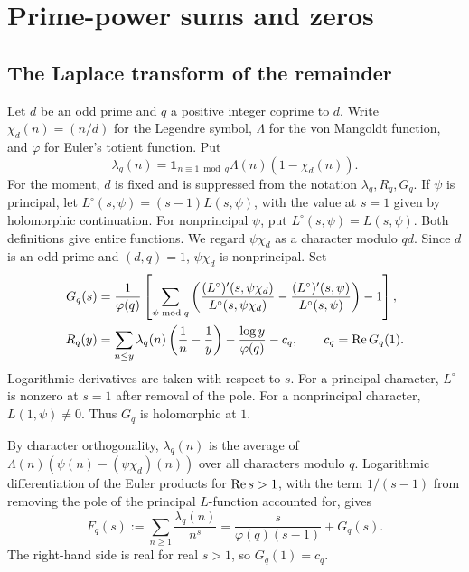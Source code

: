 \section{Prime-power sums and zeros}\label{sec:analytic}

\subsection{The Laplace transform of the remainder}

Let \(d\) be an odd prime and \(q\) a positive integer coprime to \(d\).
Write \(\chi_d(n)=(n/d)\) for the Legendre symbol, \(\Lambda\) for the von Mangoldt function,
and \(\varphi\) for Euler's totient function. Put
\[
  \lambda_q(n)=\mathbf 1_{n\equiv1\bmod q}\Lambda(n)(1-\chi_d(n)).
\]
For the moment, \(d\) is fixed and is suppressed from the notation \(\lambda_q,R_q,G_q\).
If \(\psi\) is principal, let \(L^\circ(s,\psi)=(s-1)L(s,\psi)\), with the value at
\(s=1\) given by holomorphic continuation. For nonprincipal \(\psi\), put
\(L^\circ(s,\psi)=L(s,\psi)\). Both definitions give entire functions.
We regard \(\psi\chi_d\) as a character modulo \(qd\). Since \(d\) is an odd prime
and \((d,q)=1\), \(\psi\chi_d\) is nonprincipal. Set
\begin{align}
  G_q(s)
   &=\frac1{\varphi(q)}
     \left[
       \sum_{\psi\bmod q}
       \left(
        \frac{(L^\circ)'(s,\psi\chi_d)}{L^\circ(s,\psi\chi_d)}
        -\frac{(L^\circ)'(s,\psi)}{L^\circ(s,\psi)}
       \right)-1
     \right], \label{eq:log-derivative}\\
  R_q(y)
   &= \sum_{n\le y}\lambda_q(n)\left(\frac1n-\frac1y\right)
      -\frac{\log y}{\varphi(q)}-c_q,\qquad c_q=\operatorname{Re} G_q(1).
  \label{eq:prime-remainder}
\end{align}
Logarithmic derivatives are taken with respect to \(s\). For a principal character,
\(L^\circ\) is nonzero at \(s=1\) after removal of the pole. For a nonprincipal
character, \(L(1,\psi)\ne0\). Thus \(G_q\) is holomorphic at \(1\).

By character orthogonality, \(\lambda_q(n)\) is the average of
\(\Lambda(n)(\psi(n)-(\psi\chi_d)(n))\) over all characters modulo \(q\).
Logarithmic differentiation of the Euler products for \(\operatorname{Re} s>1\), with the term
\(1/(s-1)\) from removing the pole of the principal \(L\)-function accounted for, gives
\begin{equation}\label{eq:lambda-dirichlet}
  F_q(s):=\sum_{n\ge1}\frac{\lambda_q(n)}{n^s}
        =\frac{s}{\varphi(q)(s-1)}+G_q(s).
\end{equation}
The right-hand side is real for real \(s>1\), so \(G_q(1)=c_q\).

